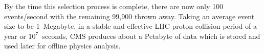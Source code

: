 By the time this selection process is complete, there are now only 100 events/second with the remaining 99,900 thrown away.
Taking an average event size to be 1~Megabyte, in a stable and effective LHC proton collision period of a year or $10^{7}$~seconds, CMS produces about a Petabyte of data which is stored and used later for offline physics analysis.
\label{Collider_And_Detector_chapter}
